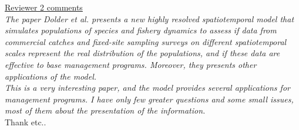 \documentclass{article}
\begin{document}
\begin{landscape}
\begin{center}
\end{center}

\underline{Reviewer 2 comments} \\

\textit{The paper Dolder et al. presents a new highly resolved spatiotemporal
	model that simulates populations of species and fishery dynamics to
	assess if data from commercial catches and fixed-site sampling surveys
	on different spatiotemporal scales represent the real distribution of
	the populations, and if these data are effective to base  management
	programs. Moreover, they presents other applications of the model.} \\

\textit{This is a very interesting paper, and the model provides several
	applications for management programs. I have only few greater questions
	and some small issues, most of them about the presentation of the
	information.}  \\

Thank etc..


\begin{center}

\large


\end{center}
\end{landscape}
\end{document}
